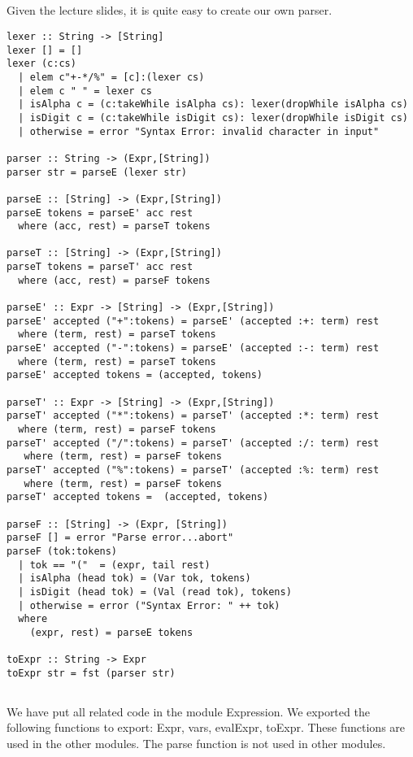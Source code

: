 \documentclass[a4paper,11pt]{article}
\begin{document}
\subsection{}
Given the lecture slides, it is quite easy to create our own parser. 

\begin{lstlisting}
lexer :: String -> [String]
lexer [] = []
lexer (c:cs)
  | elem c"+-*/%" = [c]:(lexer cs)
  | elem c " " = lexer cs
  | isAlpha c = (c:takeWhile isAlpha cs): lexer(dropWhile isAlpha cs)
  | isDigit c = (c:takeWhile isDigit cs): lexer(dropWhile isDigit cs)
  | otherwise = error "Syntax Error: invalid character in input"
  
parser :: String -> (Expr,[String])
parser str = parseE (lexer str)

parseE :: [String] -> (Expr,[String])
parseE tokens = parseE' acc rest
  where (acc, rest) = parseT tokens

parseT :: [String] -> (Expr,[String])
parseT tokens = parseT' acc rest
  where (acc, rest) = parseF tokens 

parseE' :: Expr -> [String] -> (Expr,[String])
parseE' accepted ("+":tokens) = parseE' (accepted :+: term) rest
  where (term, rest) = parseT tokens
parseE' accepted ("-":tokens) = parseE' (accepted :-: term) rest
  where (term, rest) = parseT tokens
parseE' accepted tokens = (accepted, tokens)

parseT' :: Expr -> [String] -> (Expr,[String])
parseT' accepted ("*":tokens) = parseT' (accepted :*: term) rest
  where (term, rest) = parseF tokens
parseT' accepted ("/":tokens) = parseT' (accepted :/: term) rest
   where (term, rest) = parseF tokens
parseT' accepted ("%":tokens) = parseT' (accepted :%: term) rest
   where (term, rest) = parseF tokens
parseT' accepted tokens =  (accepted, tokens)

parseF :: [String] -> (Expr, [String])
parseF [] = error "Parse error...abort"
parseF (tok:tokens)
  | tok == "("  = (expr, tail rest)
  | isAlpha (head tok) = (Var tok, tokens)
  | isDigit (head tok) = (Val (read tok), tokens)
  | otherwise = error ("Syntax Error: " ++ tok)
  where
    (expr, rest) = parseE tokens

toExpr :: String -> Expr
toExpr str = fst (parser str)
\end{lstlisting}

\subsection{}
We have put all related code in the module Expression. We exported the following functions to export: Expr, vars, evalExpr, toExpr. These functions are used in the other modules. The parse function is not used in other modules.
\end{document}
